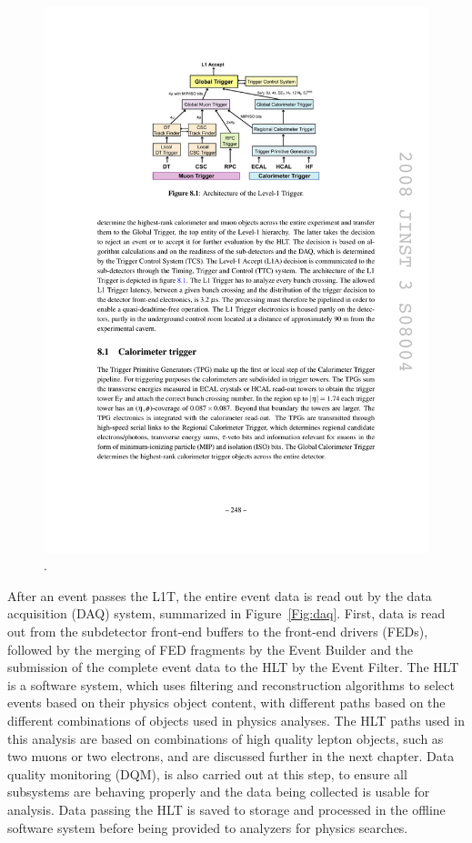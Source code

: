 \begin{figure}[tbh]
\centering
\includegraphics[width=5in]{figures/l1t.pdf}
\caption{.}
\label{fig:l1t}
\end{figure}

\indent After an event passes the L1T, the entire event data is read out by the data acquisition (DAQ) system, summarized in Figure~\ref{Fig:daq}. First, data is read out from the subdetector front-end buffers to the front-end drivers (FEDs), followed by the merging of FED fragments by the Event Builder and the submission of the complete event data to the HLT by the Event Filter. The HLT is a software system, which uses filtering and reconstruction algorithms to select events based on their physics object content, with different paths based on the different combinations of objects used in physics analyses. The HLT paths used in this analysis are based on combinations of high quality lepton objects, such as two muons or two electrons, and are discussed further in the next chapter. Data quality monitoring (DQM), is also carried out at this step, to ensure all subsystems are behaving properly and the data being collected is usable for analysis. Data passing the HLT is saved to storage and processed in the offline software system before being provided to analyzers for physics searches. 

